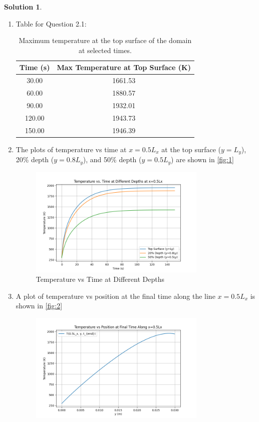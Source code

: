 \documentclass[12pt]{article}
\theoremstyle{definition} %
\newtheorem{solution}{Solution}
\theoremstyle{plain} %
\begin{document}
\begin{solution}
\begin{enumerate}
        \item Table for Question 2.1: \begin{table}[h!]
            \centering
            \begin{tabular}{|c|c|}
                \hline
                Time (s) & Max Temperature at Top Surface (K) \\ \hline
                30.00 & 1661.53 \\ \hline
                60.00 & 1880.57 \\ \hline
                90.00 & 1932.01 \\ \hline
                120.00 & 1943.73 \\ \hline
                150.00 & 1946.39 \\ \hline
            \end{tabular}
            \caption{Maximum temperature at the top surface of the domain at selected times.}
            \label{tab:maxtemp}
        \end{table}
    \item The plots of temperature vs time at $x = 0.5L_x$ at the top surface ($y = L_y$), 20\% depth ($y = 0.8L_y$), and 50\% depth ($y = 0.5L_y$) are shown in \autoref{fig:1}
     \begin{figure}[htbp]
        \centering
        \includegraphics[width=0.8\textwidth]{classes/TAM-470/06-10/Figure_2-proj2.png}
        \caption{Temperature vs Time at Different Depths}
        \label{fig:1}
    \end{figure}
    \item A plot of temperature vs position at the final time along the line $x = 0.5L_x$ is shown in \autoref{fig:2}
     \begin{figure}[htbp]
        \centering
        \includegraphics[width=0.8\textwidth]{classes/TAM-470/06-10/Figure_3-proj-2.png}

\end{figure}
\end{enumerate}
\end{solution}
\end{document}
